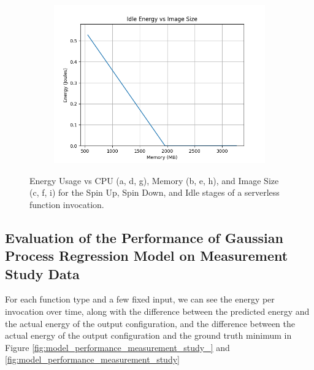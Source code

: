 \documentclass[times, 10pt,twocolumn]{article}
\begin{document}
\begin{figure}[ht]
\begin{subfigure}[b]{0.3\textwidth}
      \includegraphics[width=\textwidth]{imgs/container_study/idle_vs_img.png}
     \caption{}
     \label{fig:idle_img}
   \end{subfigure}
   
   \caption{Energy Usage vs CPU (a, d, g), Memory (b, e, h), and Image Size (c, f, i) for the Spin Up, Spin Down, and Idle stages of a serverless function invocation.}
   \label{fig:energy_stages}
 \end{figure}


 
 \subsection{Evaluation of the Performance of Gaussian Process Regression Model on Measurement Study Data }
 \label{appendix:regression_model_measurement_study}

 For each function type and a few fixed input, we can see the energy per invocation over time, along with the difference between the predicted energy and the actual energy of the output configuration, and the difference between the actual energy of the output configuration and the ground truth minimum in Figure \ref{fig:model_performance_measurement_study_} and \ref{fig:model_performance_measurement_study}
\end{document}
